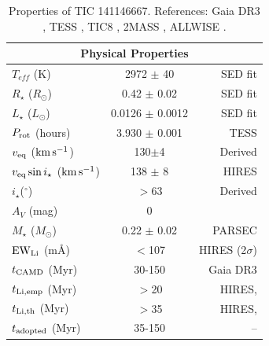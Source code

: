 \documentclass{nature3}
\newcommand{\starname}{TIC 141146667}
\newcommand{\kms}{\ensuremath{\rm km\,s^{-1}}}
\begin{document}
\begin{methods}
\begin{table}
\begin{tabular}{lcr}
    \hline
    \multicolumn{3}{c}{Physical Properties} \\
    \hline
    $T_{eff}$ (K) & 2972 $\pm$ 40 & \cite{Bouma2024} SED fit\\
    $R_\star$ ($R_{\odot}$) & 0.42 $\pm$ 0.02 & \cite{Bouma2024} SED fit \\
    $L_\star$ ($L_\odot$) & 0.0126 $\pm$ 0.0012 & \cite{Bouma2024} SED fit \\
    $P_{\rm rot}$ (hours) & 3.930 $\pm$ 0.001 & TESS \\ 
    $v_{\rm eq}$ (\kms)  &  130$\pm$4  & Derived \\
    $v_{\rm eq} \sin i_\star$ (\kms) & 138 $\pm$ 8 & HIRES \\
    $i_\star$($^\circ$) & $>$63 & Derived \\
    $A_V$ (mag) & 0 & \cite{Green2019} \\
    $M_\star$ ($M_{\odot}$)  & 0.22 $\pm$ 0.02  & PARSEC \cite{Chen2014}\\
    ${\rm EW}_{\rm Li}$ (m\AA) & $<$107 & HIRES (2$\sigma$)\\
    $t_{\rm CAMD}$ (Myr) & 30-150 &  Gaia DR3 \\
    $t_{\rm Li,emp}$ (Myr) & $>$20 &  HIRES, \cite{Jeffries2023} \\
    $t_{\rm Li,th}$ (Myr) & $>$35 &  HIRES, \cite{Feiden2016} \\
    $t_{\rm adopted}$ (Myr) & 35-150 &  -- \\
    \hline
    \end{tabular}
		\caption{Properties of \starname.  References:
    Gaia DR3 \cite{GaiaDR3}, TESS \cite{Ricker2015},
    TIC8 \cite{Stassun2019}, 2MASS \cite{Skrutskie2006}, ALLWISE
    \cite{Cutri2014}.}
    \label{tab:stparams}
\end{table}



\end{methods}
\end{document}
